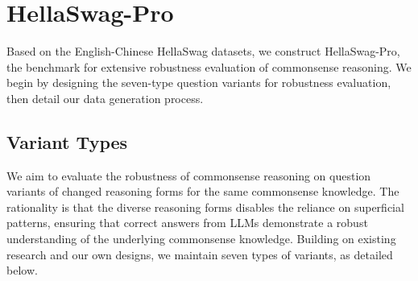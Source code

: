 \section{HellaSwag-Pro}

Based on the English-Chinese HellaSwag datasets, we construct HellaSwag-Pro, the benchmark for extensive robustness evaluation of commonsense reasoning. 
We begin by designing the seven-type question variants for robustness evaluation, then detail our data generation process. 


\subsection{Variant Types}
We aim to evaluate the robustness of commonsense reasoning on question variants of changed reasoning forms for the same commonsense knowledge. 
The rationality is that the diverse reasoning forms disables the reliance on superficial patterns, ensuring that correct answers from LLMs demonstrate a robust understanding of the underlying commonsense knowledge. 
Building on existing research \cite{guo2024exploring, ma2024kor, balepur2024s} and our own designs, we maintain seven types of variants, as detailed below. 

